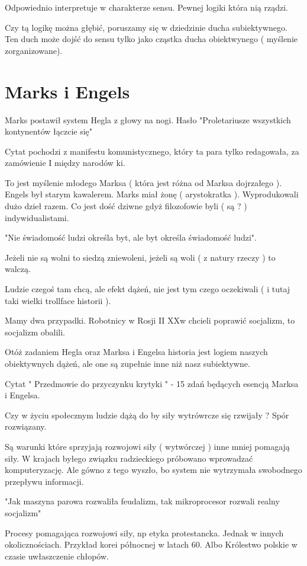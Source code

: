 \documentclass[11pt]{article}
\begin{document}
Odpowiednio interpretuje w charakterze sensu. Pewnej logiki która nią rządzi. 

Czy tą logikę można głębić, poruszamy się w dziedzinie ducha subiektywnego. Ten duch może dojść do sensu tylko jako cząstka ducha obiektwynego ( myślenie zorganizowane).

\section{Marks i Engels}

Marks postawił system Hegla z głowy na nogi.
Hasło "Proletariusze wszystkich kontynentów łączcie się" 

Cytat pochodzi z manifestu komunistycznego, który ta para tylko redagowała, za zamówienie I między narodów ki. 

To jest myślenie młodego Marksa ( która jest różna od Marksa dojrzałego ). Engels był starym kawalerem. Marks miał żonę ( arystokratka ). Wyprodukowali dużo dzieł razem. Co jest dość dziwne gdyż filozofowie byli ( są ? ) indywidualistami. 

"Nie świadomość ludzi określa byt, ale byt określa świadomość ludzi". 

Jeżeli nie są wolni to siedzą zniewoleni, jeżeli są woli ( z natury rzeczy ) to walczą.

Ludzie czegoś tam chcą, ale efekt dążeń, nie jest tym czego oczekiwali ( i tutaj taki wielki trollface historii ).

Mamy dwa przypadki. Robotnicy w Rosji II XXw chcieli poprawić socjalizm, to socjalizm obalili.

Otóż zadaniem Hegla oraz Marksa i Engelsa historia jest logiem naszych obiektywnych dążeń, ale one są zupełnie inne niż nasz subiektywne.

Cytat " Przedmowie do przyczynku krytyki " - 15 zdań będących esencją Marksa i Engelsa.

Czy w życiu społecznym ludzie dążą do by siły wytrówrcze się rzwijały ? Spór rozwiązany.

Są warunki które sprzyjają rozwojowi siły ( wytwórczej ) inne mniej pomagają siły. W krajach byłego związku radzieckiego próbowano wprowadzać komputeryzację. Ale gówno z tego wyszło, bo system nie wytrzymała swobodnego przepływu informacji.

"Jak maszyna parowa rozwaliła feudalizm, tak mikroprocesor rozwali realny socjalizm" 

Procesy pomagająca rozwojowi siły, np etyka protestancka. Jednak w innych okolicznościach. Przykład korei północnej w latach 60. Albo Królestwo polskie w czasie uwłaszczenie chłopów. 
\end{document}
